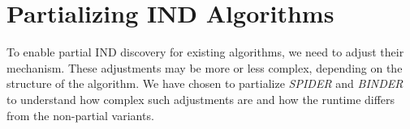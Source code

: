 \section{Partializing IND Algorithms}\label{sec:algo_partial}
To enable partial IND discovery for existing algorithms, we need to adjust their mechanism. These adjustments may be more or less complex, depending on the structure of the algorithm. We have chosen to partialize \textit{SPIDER} \cite{bauckmann2006efficiently} and \textit{BINDER} \cite{papenbrock2015divide} to understand how complex such adjustments are and how the runtime differs from the non-partial variants.

